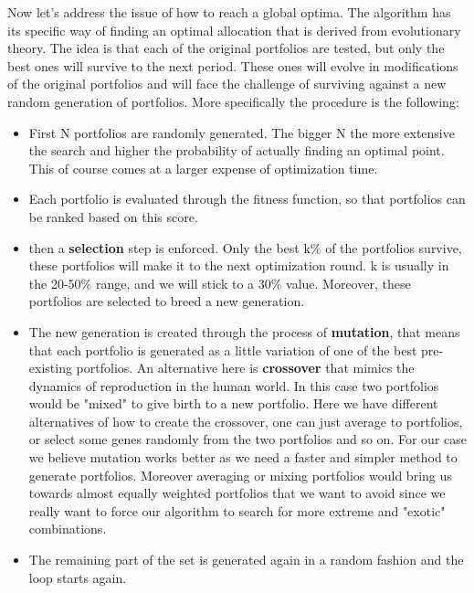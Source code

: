 Now let's address the issue of how to reach a global optima. The algorithm has its specific way of finding an optimal allocation that is derived from evolutionary theory. The idea is that each of the original portfolios are tested, but only the best ones will survive to the next period. These ones will evolve in modifications of the original portfolios and will face the challenge of surviving against a new random generation of portfolios. More specifically the procedure is the following:

\begin{itemize}
	\item First N portfolios are randomly generated. The bigger N the more extensive the search and higher the probability of actually finding an optimal point. This of course comes at a larger expense of optimization time.
	\item Each portfolio is evaluated through the fitness function, so that portfolios can be ranked based on this score.
	\item then a \textbf{selection} step is enforced. Only the best k\% of the portfolios survive, these portfolios will make it to the next optimization round. k is usually in the 20-50\% range, and we will stick to a 30\% value. Moreover, these portfolios are selected to breed a new generation.
	\item The new generation is created through the process of \textbf{mutation}, that means that each portfolio is generated as a little variation of one of the best pre-existing portfolios. An alternative here is \textbf{crossover} that mimics the dynamics of reproduction in the human world. In this case two portfolios would be "mixed" to give birth to a new portfolio. Here we have different alternatives of how to create the crossover, one can just average to portfolios, or select some genes randomly from the two portfolios and so on. For our case we believe mutation works better as we need a faster and simpler method to generate portfolios. Moreover averaging or mixing portfolios would bring us towards almost equally weighted portfolios that we want to avoid since we really want to force our algorithm to search for more extreme and "exotic" combinations. 
	\item The remaining part of the set is generated again in a random fashion and the loop starts again.
\end{itemize}

